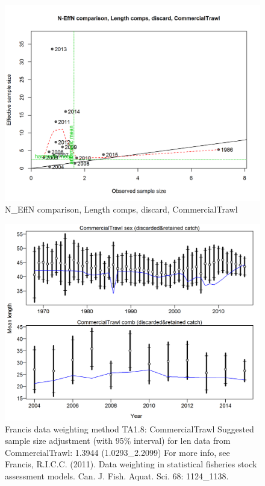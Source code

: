 \documentclass[12pt,]{article}
\begin{document}
\begin{figure}[htbp]
\centering
\includegraphics{./r4ss/plots_mod1/comp_lenfit_sampsize_flt1mkt1.png}
\caption{N\_EffN comparison, Length comps, discard, CommercialTrawl
\label{fig:mod1_8_comp_lenfit_sampsize_flt1mkt1}}
\end{figure}

\begin{figure}[htbp]
\centering
\includegraphics{./r4ss/plots_mod1/comp_lenfit_data_weighting_TA1.8_CommercialTrawl.png}
\caption{Francis data weighting method TA1.8: CommercialTrawl Suggested
sample size adjustment (with 95\% interval) for len data from
CommercialTrawl: 1.3944 (1.0293\_2.2099) For more info, see Francis,
R.I.C.C. (2011). Data weighting in statistical fisheries stock
assessment models. Can. J. Fish. Aquat. Sci. 68: 1124\_1138.
\label{fig:mod1_9_comp_lenfit_data_weighting_TA1.8_CommercialTrawl}}
\end{figure}
\end{document}
